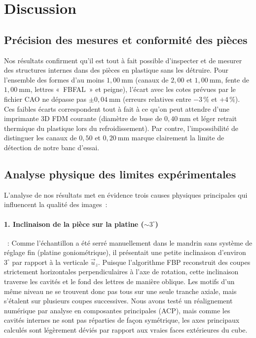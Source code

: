 \section{Discussion}
\label{sec:discussion}

\subsection{Précision des mesures et conformité des pièces}
Nos résultats confirment qu'il est tout à fait possible d'inspecter et de mesurer des structures internes dans des pièces en plastique sans les détruire. Pour l'ensemble des formes d'au moins $1{,}00~\text{mm}$ (canaux de $2{,}00$ et $1{,}00~\text{mm}$, fente de $1{,}00~\text{mm}$, lettres «~FBFAL~» et peigne), l'écart avec les cotes prévues par le fichier CAO ne dépasse pas $\pm 0{,}04~\text{mm}$ (erreurs relatives entre $-3\,\%$ et $+4\,\%$). Ces faibles écarts correspondent tout à fait à ce qu'on peut attendre d'une imprimante 3D FDM courante (diamètre de buse de $0{,}40~\text{mm}$ et léger retrait thermique du plastique lors du refroidissement). Par contre, l'impossibilité de distinguer les canaux de $0{,}50$ et $0{,}20~\text{mm}$ marque clairement la limite de détection de notre banc d'essai.

\subsection{Analyse physique des limites expérimentales}
L'analyse de nos résultats met en évidence trois causes physiques principales qui influencent la qualité des images~:

\paragraph{1. Inclinaison de la pièce sur la platine ($\sim 3^\circ$)}~:
Comme l'échantillon a été serré manuellement dans le mandrin sans système de réglage fin (platine goniométrique), il présentait une petite inclinaison d'environ $3^\circ$ par rapport à la verticale $\vec{u}_z$. Puisque l'algorithme FBP reconstruit des coupes strictement horizontales perpendiculaires à l'axe de rotation, cette inclinaison traverse les cavités et le fond des lettres de manière oblique. Les motifs d'un même niveau ne se trouvent donc pas tous sur une seule tranche axiale, mais s'étalent sur plusieurs coupes successives. Nous avons testé un réalignement numérique par analyse en composantes principales (ACP), mais comme les cavités internes ne sont pas réparties de façon symétrique, les axes principaux calculés sont légèrement déviés par rapport aux vraies faces extérieures du cube.


